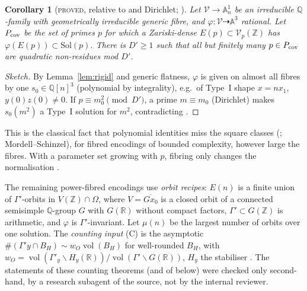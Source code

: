 \documentclass[10pt,reqno]{amsart}
\newtheorem{corollary}[theorem]{Corollary}
\theoremstyle{definition}
\numberwithin{equation}{section}
\newcommand{\Z}{\mathbb Z}
\newcommand{\Q}{\mathbb Q}
\newcommand{\R}{\mathbb R}
\newcommand{\status}[1]{\textup{\textsc{#1}}}
\begin{document}
\begin{corollary}[\status{proved}, relative to {\cite[Prop.~1.6]{ET}} and Dirichlet; {\cite[Cor.~2.4]{LF}}]\label{cor:uniformalg}
Let $\mathcal V\to\mathbb A^1_n$ be an irreducible $\Q$-family with
geometrically irreducible generic fibre, and $\varphi:\mathcal V\dashrightarrow\mathbb A^3$
rational. Let $P_{\rm cov}$ be the set of primes $p$ for which a
Zariski-dense $E(p)\subset\mathcal V_p(\Z)$ has $\varphi(E(p))\subset\mathrm{Sol}(p)$.
There is $D'\ge1$ such that all but finitely many $p\in P_{\rm cov}$ are
quadratic non-residues mod $D'$.
\end{corollary}
\begin{proof}[Sketch]
By Lemma~\ref{lem:rigid} and generic flatness, $\varphi$ is given on almost
all fibres by one $s_0\in\Q[n]^3$ (polynomial by integrality), e.g.\ of
Type~I shape $x=nx_1$, $y(0)z(0)\ne0$. If $p\equiv m_0^2\pmod{D'}$, a prime
$m\equiv m_0$ (Dirichlet) makes $s_0(m^2)$ a Type~I solution for $m^2$,
contradicting \cite[Prop.~1.6]{ET}.
\end{proof}
This is the classical fact that polynomial identities miss the square
classes (\cite[Props.~1.8--1.9]{ET}; Mordell--Schinzel), for fibred
encodings of bounded complexity, however large the fibres. With a
parameter set growing with $p$, fibring only changes the normalisation
\cite[Cor.~2.5]{LF}.

The remaining power-fibred encodings use \emph{orbit recipes}: $E(n)$ is a
finite union of $\Gamma'$-orbits in $V(\Z)\cap\Omega$, where $V=\overline{Gx_0}$
is a closed orbit of a connected semisimple $\Q$-group $G$ with $G(\R)$
without compact factors, $\Gamma'\subset G(\Z)$ is arithmetic, and $\varphi$
is $\Gamma'$-invariant. Let $\mu(n)$ be the largest number of orbits over one
solution. The \emph{counting input} (C) is the asymptotic
$\#(\Gamma'y\cap B_H)\sim w_O\operatorname{vol}(B_H)$ for well-rounded $B_H$, with
$w_O=\operatorname{vol}(\Gamma'_y\backslash H_y(\R))/\operatorname{vol}(\Gamma'\backslash G(\R))$,
$H_y$ the stabiliser \cite{DRS,EM,EMS}. The statements of these counting
theorems (and of \cite{BR,CTX} below) were checked only second-hand, by
a research subagent of the source, not by the internal reviewer.
\end{document}
